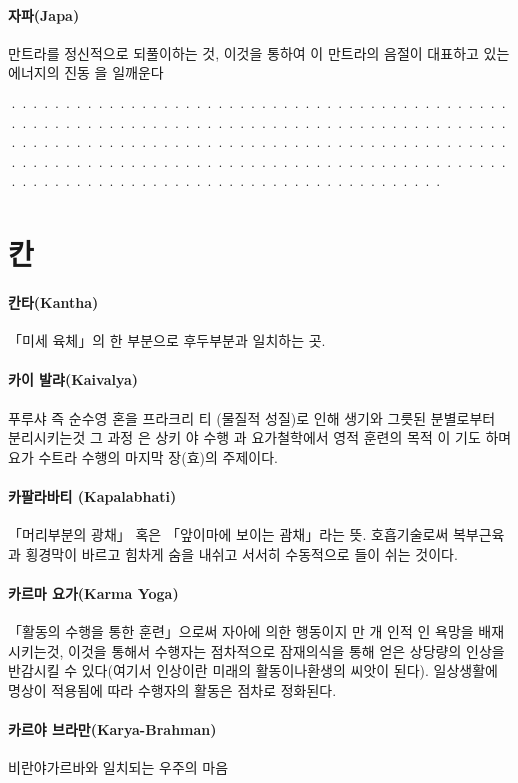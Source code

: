 \documentclass[12pt, a4paper, oneside]{book}
\let\stdsection\section
\renewcommand\section{\newpage\stdsection}
\begin{document}
\paragraph{자파(Japa)}
만트라를 정신적으로 되풀이하는 것, 이것을 통하여 이 만트라의 음절이 대표하고 있는 에너지의 진동 을 일깨운다

································································································································································································································

\newpage
\section{칸}

\paragraph{칸타(Kantha)}
「미세 육체」의 한 부분으로 후두부분과 일치하는 곳.

\paragraph{카이 발랴(Kaivalya)}
푸루샤 즉 순수영 혼을 프라크리 티 (물질적 성질)로 인해 생기와 그릇된 분별로부터 분리시키는것 그 과정 은 상키 야 수행 과 요가철학에서 영적 훈련의 목적 이 기도 하며 요가 수트라 수행의 마지막 장(효)의 주제이다.

\paragraph{카팔라바티 (Kapalabhati)}
「머리부분의 광채」 혹은 「앞이마에 보이는 괌채」라는 뜻. 호흡기술로써 복부근육과 횡경막이 바르고 힘차게 숨을 내쉬고 서서히 수동적으로 들이 쉬는 것이다.

\paragraph{카르마 요가(Karma Yoga)}
「활동의 수행을 통한 훈련」으로써 자아에 의한 행동이지 만 개 인적 인 욕망을 배재시키는것, 이것을 통해서 수행자는 점차적으로 잠재의식을 통해    얻은 상당량의 인상을 반감시킬 수 있다(여기서 인상이란 미래의 활동이나환생의 씨앗이 된다). 일상생활에 명상이 적용됨에 따라 수행자의 활동은 점차로 정화된다.

\paragraph{카르야 브라만(Karya-Brahman)}
비란야가르바와 일치되는 우주의 마음
\end{document}
